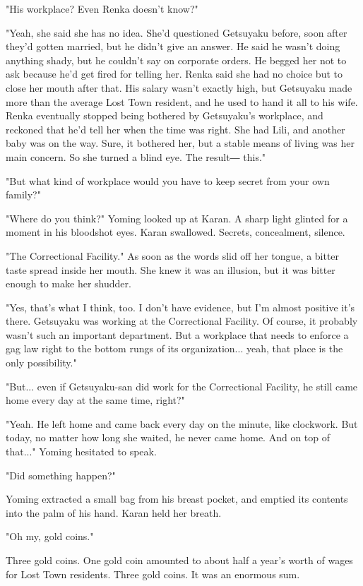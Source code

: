 "His workplace? Even Renka doesn't know?"

"Yeah, she said she has no idea. She'd questioned Getsuyaku before, soon
after they'd gotten married, but he didn't give an answer. He said he
wasn't doing anything shady, but he couldn't say on corporate orders. He
begged her not to ask because he'd get fired for telling her. Renka said
she had no choice but to close her mouth after that. His salary wasn't
exactly high, but Getsuyaku made more than the average Lost Town
resident, and he used to hand it all to his wife. Renka eventually
stopped being bothered by Getsuyaku's workplace, and reckoned that he'd
tell her when the time was right. She had Lili, and another baby was on
the way. Sure, it bothered her, but a stable means of living was her
main concern. So she turned a blind eye. The result― this."

"But what kind of workplace would you have to keep secret from your own
family?"

"Where do you think?" Yoming looked up at Karan. A sharp light glinted
for a moment in his bloodshot eyes. Karan swallowed. Secrets,
concealment, silence.

"The Correctional Facility." As soon as the words slid off her tongue, a
bitter taste spread inside her mouth. She knew it was an illusion, but
it was bitter enough to make her shudder.

"Yes, that's what I think, too. I don't have evidence, but I'm almost
positive it's there. Getsuyaku was working at the Correctional Facility.
Of course, it probably wasn't such an important department. But a
workplace that needs to enforce a gag law right to the bottom rungs of
its organization... yeah, that place is the only possibility."

"But... even if Getsuyaku-san did work for the Correctional Facility, he
still came home every day at the same time, right?"

"Yeah. He left home and came back every day on the minute, like
clockwork. But today, no matter how long she waited, he never came home.
And on top of that..." Yoming hesitated to speak.

"Did something happen?"

Yoming extracted a small bag from his breast pocket, and emptied its
contents into the palm of his hand. Karan held her breath.

"Oh my, gold coins."

Three gold coins. One gold coin amounted to about half a year's worth of
wages for Lost Town residents. Three gold coins. It was an enormous sum.


